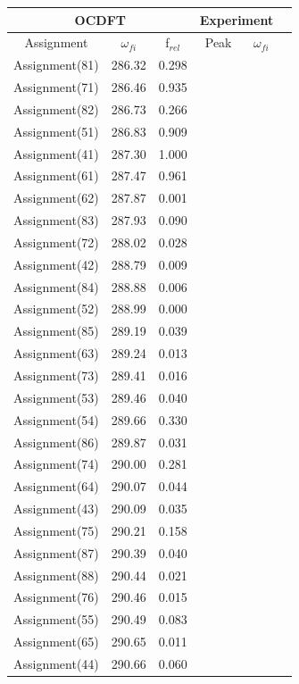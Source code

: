 \documentclass[11.5pt]{article}
\begin{document}
   \begin{table}
 \centering
     \begin{tabular}{c@{\hskip 0.22in}c@{\hskip 0.22in}c@{\hskip 0.52in}c@{\hskip 0.22in}c@{\hskip 0.22in}c}
     \hline
     \hline
   \multicolumn{3}{c}{OCDFT} &\multicolumn{2}{c}{Experiment} \\
   \hline
   Assignment & $\omega_{fi}$ & f$_{rel}$ & Peak &  $\omega_{fi}$   \\
   \hline
 Assignment(81) & 286.32 & 0.298 \\
 Assignment(71) & 286.46 & 0.935 \\
 Assignment(82) & 286.73 & 0.266 \\
 Assignment(51) & 286.83 & 0.909 \\
 Assignment(41) & 287.30 & 1.000 \\
 Assignment(61) & 287.47 & 0.961 \\
 Assignment(62) & 287.87 & 0.001 \\
 Assignment(83) & 287.93 & 0.090 \\
 Assignment(72) & 288.02 & 0.028 \\
 Assignment(42) & 288.79 & 0.009 \\
 Assignment(84) & 288.88 & 0.006 \\
 Assignment(52) & 288.99 & 0.000 \\
 Assignment(85) & 289.19 & 0.039 \\
 Assignment(63) & 289.24 & 0.013 \\
 Assignment(73) & 289.41 & 0.016 \\
 Assignment(53) & 289.46 & 0.040 \\
 Assignment(54) & 289.66 & 0.330 \\
 Assignment(86) & 289.87 & 0.031 \\
 Assignment(74) & 290.00 & 0.281 \\
 Assignment(64) & 290.07 & 0.044 \\
 Assignment(43) & 290.09 & 0.035 \\
 Assignment(75) & 290.21 & 0.158 \\
 Assignment(87) & 290.39 & 0.040 \\
 Assignment(88) & 290.44 & 0.021 \\
 Assignment(76) & 290.46 & 0.015 \\
 Assignment(55) & 290.49 & 0.083 \\
 Assignment(65) & 290.65 & 0.011 \\
 Assignment(44) & 290.66 & 0.060 \\

\end{tabular}
\end{table}
\end{document}
